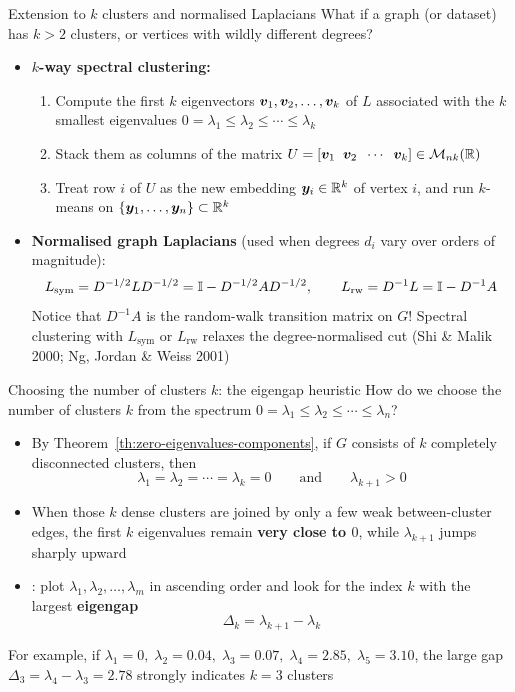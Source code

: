 \documentclass[aspectratio=169]{beamer}\usepackage[]{graphicx}\usepackage[]{xcolor}
\begin{document}
\begin{frame}{Extension to $k$ clusters and normalised Laplacians}
What if a graph (or dataset) has $k > 2$ clusters, or vertices with wildly different degrees?
\vfill
\begin{itemize}
\item \textbf{$k$-way spectral clustering:}
\begin{enumerate}
\item Compute the first $k$ eigenvectors $\bm{v}_1, \bm{v}_2, \ldots, \bm{v}_k$ of $L$ associated with the $k$ smallest eigenvalues $0 = \lambda_1 \le \lambda_2 \le \cdots \le \lambda_k$
\item Stack them as columns of the matrix $U = [\bm{v}_1 \;\; \bm{v}_2 \;\; \cdots \;\; \bm{v}_k] \in \mathcal{M}_{nk}(\mathbb{R})$
\item Treat row $i$ of $U$ as the new embedding $\bm{y}_i \in \mathbb{R}^k$ of vertex $i$, and run $k$-means on $\{\bm{y}_1, \ldots, \bm{y}_n\} \subset \mathbb{R}^k$
\end{enumerate}
\vfill
\item \textbf{Normalised graph Laplacians} (used when degrees $d_i$ vary over orders of magnitude):
\[
L_{\text{sym}} = D^{-1/2} L D^{-1/2} = \mathbb{I} - D^{-1/2} A D^{-1/2}, \qquad
L_{\text{rw}} = D^{-1} L = \mathbb{I} - D^{-1} A
\]
Notice that $D^{-1} A$ is the random-walk transition matrix on $G$! Spectral clustering with $L_{\text{sym}}$ or $L_{\text{rw}}$ relaxes the degree-normalised cut (Shi \& Malik 2000; Ng, Jordan \& Weiss 2001)
\end{itemize}
\end{frame}


\begin{frame}{Choosing the number of clusters $k$: the eigengap heuristic}
How do we choose the number of clusters $k$ from the spectrum $0 = \lambda_1 \le \lambda_2 \le \cdots \le \lambda_n$?
\vfill
\begin{itemize}
\item By Theorem~\ref{th:zero-eigenvalues-components}, if $G$ consists of $k$ completely disconnected clusters, then
\[
\lambda_1 = \lambda_2 = \cdots = \lambda_k = 0 \qquad \text{and} \qquad \lambda_{k+1} > 0
\]
\item When those $k$ dense clusters are joined by only a few weak between-cluster edges, the first $k$ eigenvalues remain \textbf{very close to $0$}, while $\lambda_{k+1}$ jumps sharply upward
\vfill
\item {}: plot $\lambda_1, \lambda_2, \ldots, \lambda_m$ in ascending order and look for the index $k$ with the largest \textbf{eigengap}
\[
\Delta_k = \lambda_{k+1} - \lambda_k
\]
\end{itemize}
\vfill
For example, if $\lambda_1 = 0, \; \lambda_2 = 0.04, \; \lambda_3 = 0.07, \; \lambda_4 = 2.85, \; \lambda_5 = 3.10$, the large gap $\Delta_3 = \lambda_4 - \lambda_3 = 2.78$ strongly indicates $k = 3$ clusters
\end{frame}
\end{document}
